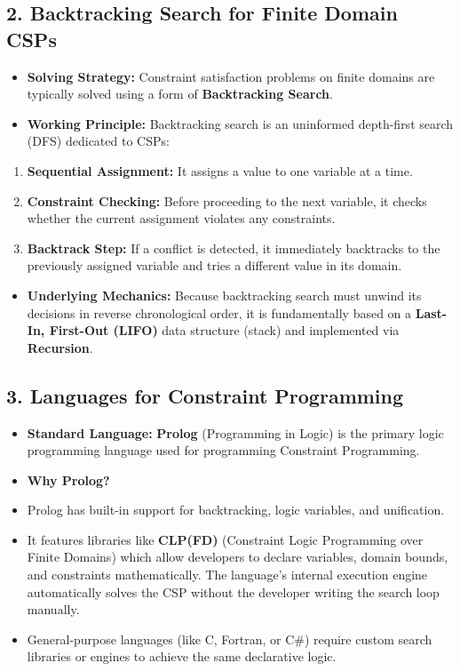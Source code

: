 \subsection{2. Backtracking Search for Finite Domain CSPs}
\begin{itemize}
  \item   \textbf{Solving Strategy:} Constraint satisfaction problems on finite domains are typically solved using a form of \textbf{Backtracking Search}.
  \item   \textbf{Working Principle:} Backtracking search is an uninformed depth-first search (DFS) dedicated to CSPs:
\end{itemize}
\begin{enumerate}
  \item \textbf{Sequential Assignment:} It assigns a value to one variable at a time.
  \item \textbf{Constraint Checking:} Before proceeding to the next variable, it checks whether the current assignment violates any constraints.
  \item \textbf{Backtrack Step:} If a conflict is detected, it immediately backtracks to the previously assigned variable and tries a different value in its domain.
\end{enumerate}
\begin{itemize}
  \item   \textbf{Underlying Mechanics:} Because backtracking search must unwind its decisions in reverse chronological order, it is fundamentally based on a \textbf{Last-In, First-Out (LIFO)} data structure (stack) and implemented via \textbf{Recursion}.
\end{itemize}

\subsection{3. Languages for Constraint Programming}
\begin{itemize}
  \item   \textbf{Standard Language:} \textbf{Prolog} (Programming in Logic) is the primary logic programming language used for programming Constraint Programming.
  \item   \textbf{Why Prolog?}
  \item   Prolog has built-in support for backtracking, logic variables, and unification.
  \item   It features libraries like \textbf{CLP(FD)} (Constraint Logic Programming over Finite Domains) which allow developers to declare variables, domain bounds, and constraints mathematically. The language's internal execution engine automatically solves the CSP without the developer writing the search loop manually.
  \item   General-purpose languages (like C, Fortran, or C\#) require custom search libraries or engines to achieve the same declarative logic.
\end{itemize}

